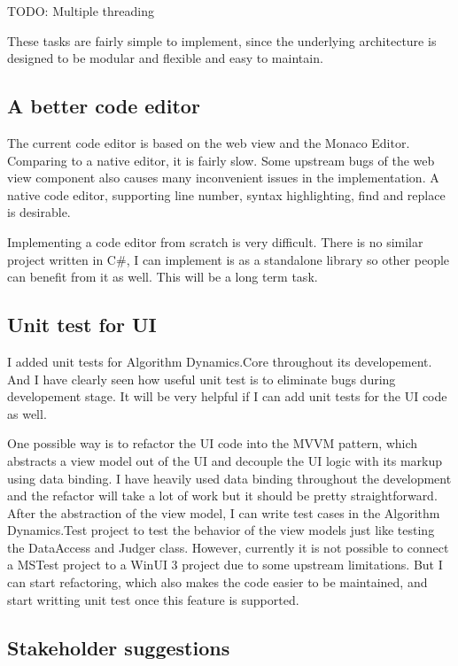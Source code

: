 \documentclass[a4paper]{report}
\begin{document}
TODO: Multiple threading

These tasks are fairly simple to implement, since the underlying architecture is designed to be modular and flexible and easy to maintain.

\subsection{A better code editor}

The current code editor is based on the web view and the Monaco Editor. Comparing to a native editor, it is fairly slow. Some upstream bugs of the web view component also causes many inconvenient issues in the implementation. A native code editor, supporting line number, syntax highlighting, find and replace is desirable.

Implementing a code editor from scratch is very difficult. There is no similar project written in C\#, I can implement is as a standalone library so other people can benefit from it as well. This will be a long term task.

\subsection{Unit test for UI}

I added unit tests for Algorithm Dynamics.Core throughout its developement. And I have clearly seen how useful unit test is to eliminate bugs during developement stage. It will be very helpful if I can add unit tests for the UI code as well.

One possible way is to refactor the UI code into the MVVM\cite{microsoft:docs:mvvm-introduction} pattern, which abstracts a view model out of the UI and decouple the UI logic with its markup using data binding\cite{microsoft:docs:data-binding-and-mvvm}. I have heavily used data binding throughout the development and the refactor will take a lot of work but it should be pretty straightforward. After the abstraction of the view model, I can write test cases in the Algorithm Dynamics.Test project to test the behavior of the view models just like testing the DataAccess and Judger class. However, currently it is not possible to connect a MSTest project to a WinUI 3 project due to some upstream limitations\cite{github:microsoft-ui-xaml:6258}. But I can start refactoring, which also makes the code easier to be maintained, and start writting unit test once this feature is supported.

\subsection{Stakeholder suggestions}
\end{document}
